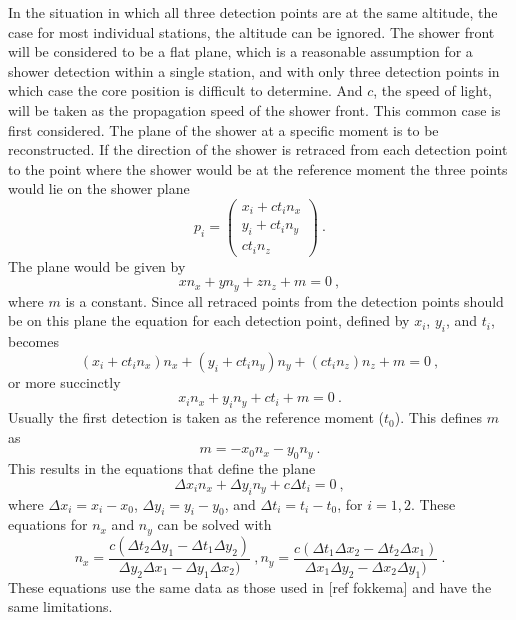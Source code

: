 In the situation in which all three detection points are at the same altitude, the case for most individual stations, the altitude can be ignored. The shower front will be considered to be a flat plane, which is a reasonable assumption for a shower detection within a single station, and with only three detection points in which case the core position is difficult to determine. And $c$, the speed of light, will be taken as the propagation speed of the shower front. This common case is first considered. The plane of the shower at a specific moment is to be reconstructed. If the direction of the shower is retraced from each detection point to the point where the shower would be at the reference moment the three points would lie on the shower plane
%
\begin{equation}
    p_i = \begin{pmatrix}
              x_i + c t_i n_x \\
              y_i + c t_i n_y \\
              c t_i n_z
          \end{pmatrix} \ .
\end{equation}
%
The plane would be given by
%
\begin{equation}
    x n_x + y n_y + z n_z + m = 0 \ ,
\end{equation}
%
where $m$ is a constant. Since all retraced points from the detection points should be on this plane the equation for each detection point, defined by $x_i$, $y_i$, and $t_i$, becomes
%
\begin{equation}
    (x_i + c t_i n_x) n_x + (y_i + c t_i n_y) n_y + (c t_i n_z) n_z + m = 0 \ ,
\end{equation}
%
or more succinctly
%
\begin{equation}
    x_i n_x + y_i n_y + c t_i + m = 0 \ .
\end{equation}
%
Usually the first detection is taken as the reference moment ($t_0$). This defines $m$ as
%
\begin{equation}
    m = - x_0 n_x - y_0 n_y \ .
\end{equation}
%
This results in the equations that define the plane
%
\begin{equation}
    \Delta x_i n_x + \Delta y_i n_y + c \Delta t_i = 0 \ ,
\end{equation}
%
where $\Delta x_i = x_i - x_0$, $\Delta y_i = y_i - y_0$, and $\Delta t_i = t_i - t_0$, for $i = 1,2$.
%
These equations for $n_x$ and $n_y$ can be solved with
%
\begin{equation}
    n_x = \frac{c (\Delta t_2 \Delta y_1 - \Delta t_1 \Delta y_2)}
     		   {\Delta y_2 \Delta x_1 - \Delta y_1 \Delta x_2)} \ ,
    n_y = \frac{c (\Delta t_1 \Delta x_2 - \Delta t_2 \Delta x_1)}
     		   {\Delta x_1 \Delta y_2 - \Delta x_2 \Delta y_1)} \ .
\end{equation}
%
These equations use the same data as those used in [ref fokkema] and have the same limitations.


